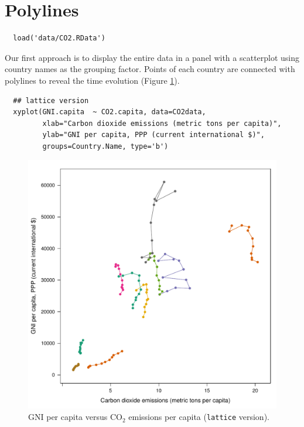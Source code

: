 
\section{Polylines}
\label{sec:org0978822}
\lstset{language=r,label= ,caption= ,captionpos=b,numbers=none}
\begin{lstlisting}
  load('data/CO2.RData')
\end{lstlisting}




Our first approach is to display the entire data in a panel with a
scatterplot using country names as the grouping factor. Points of each
country are connected with polylines to reveal the time evolution
(Figure \ref{fig:CO2-GNI}).
\lstset{language=r,label= ,caption= ,captionpos=b,numbers=none}
\begin{lstlisting}
  ## lattice version
  xyplot(GNI.capita  ~ CO2.capita, data=CO2data,
         xlab="Carbon dioxide emissions (metric tons per capita)",
         ylab="GNI per capita, PPP (current international $)",
         groups=Country.Name, type='b')
\end{lstlisting}

\begin{figure}[htbp]
\centering
\includegraphics[width=.9\linewidth]{figs/CO2_GNI.pdf}
\caption{GNI per capita versus \(\mathrm{CO_2}\) emissions per capita (\texttt{lattice} version). \label{fig:CO2-GNI}}
\end{figure}


